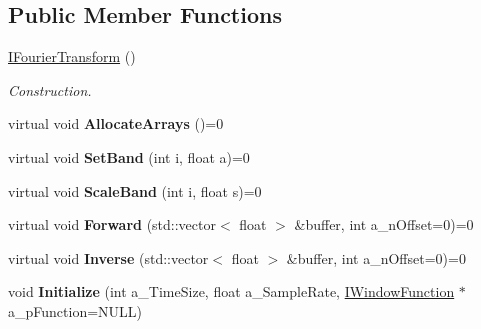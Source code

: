\subsection*{Public Member Functions}
\begin{DoxyCompactItemize}
\item 
\mbox{\label{class_i_fourier_transform_a82befe0906b68bfbf00e0591ce54fcfe}} 
\hyperlink{class_i_fourier_transform_a82befe0906b68bfbf00e0591ce54fcfe}{I\+Fourier\+Transform} ()
\begin{DoxyCompactList}\small\item\em Construction. \end{DoxyCompactList}\item 
\mbox{\label{class_i_fourier_transform_ae1d2976c7ff1193ef9102e1f5c47f19b}} 
virtual void {\bfseries Allocate\+Arrays} ()=0
\item 
\mbox{\label{class_i_fourier_transform_a1d64a970f3e5f48bc925b556ab539609}} 
virtual void {\bfseries Set\+Band} (int i, float a)=0
\item 
\mbox{\label{class_i_fourier_transform_a8ea0068a486051050b5aaf4b10064826}} 
virtual void {\bfseries Scale\+Band} (int i, float s)=0
\item 
\mbox{\label{class_i_fourier_transform_a3e7b1f3ffe8bcb8898a2f09e2f04db98}} 
virtual void {\bfseries Forward} (std\+::vector$<$ float $>$ \&buffer, int a\+\_\+n\+Offset=0)=0
\item 
\mbox{\label{class_i_fourier_transform_a4d8469a82bdc9baea257ff924e5890d3}} 
virtual void {\bfseries Inverse} (std\+::vector$<$ float $>$ \&buffer, int a\+\_\+n\+Offset=0)=0
\item 
\mbox{\label{class_i_fourier_transform_a0877933d72294a8918a01168a5e35dc4}} 
void {\bfseries Initialize} (int a\+\_\+\+Time\+Size, float a\+\_\+\+Sample\+Rate, \hyperlink{class_i_window_function}{I\+Window\+Function} $\ast$a\+\_\+p\+Function=N\+U\+LL)
\item 
\mbox{\label{class_i_fourier_transform_af46038f00e4d84a74b32a820b7416b30}} 

\end{DoxyCompactItemize}
